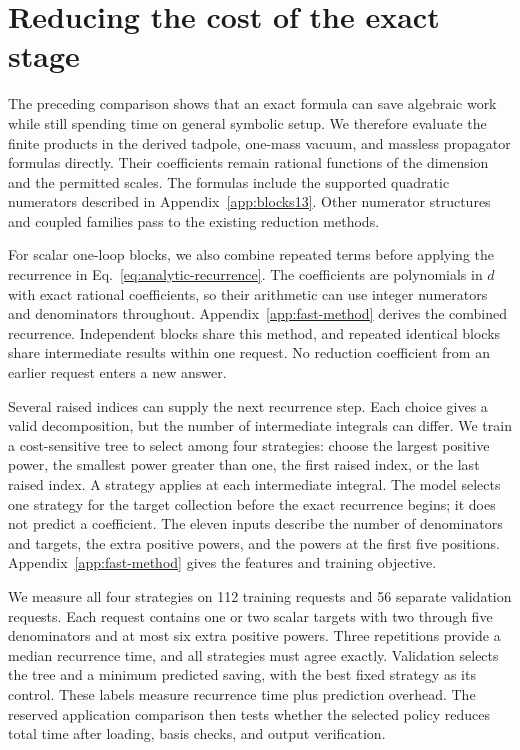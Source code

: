 \section{Reducing the cost of the exact stage}
\label{sec:fast-method}
The preceding comparison shows that an exact formula can save algebraic work while still spending time on general symbolic setup. We therefore evaluate the finite products in the derived tadpole, one-mass vacuum, and massless propagator formulas directly. Their coefficients remain rational functions of the dimension and the permitted scales. The formulas include the supported quadratic numerators described in Appendix~\ref{app:blocks13}. Other numerator structures and coupled families pass to the existing reduction methods.

For scalar one-loop blocks, we also combine repeated terms before applying the recurrence in Eq.~\eqref{eq:analytic-recurrence}. The coefficients are polynomials in $d$ with exact rational coefficients, so their arithmetic can use integer numerators and denominators throughout. Appendix~\ref{app:fast-method} derives the combined recurrence. Independent blocks share this method, and repeated identical blocks share intermediate results within one request. No reduction coefficient from an earlier request enters a new answer.

Several raised indices can supply the next recurrence step. Each choice gives a valid decomposition, but the number of intermediate integrals can differ. We train a cost-sensitive tree to select among four strategies: choose the largest positive power, the smallest power greater than one, the first raised index, or the last raised index. A strategy applies at each intermediate integral. The model selects one strategy for the target collection before the exact recurrence begins; it does not predict a coefficient. The eleven inputs describe the number of denominators and targets, the extra positive powers, and the powers at the first five positions. Appendix~\ref{app:fast-method} gives the features and training objective.

We measure all four strategies on 112 training requests and 56 separate validation requests. Each request contains one or two scalar targets with two through five denominators and at most six extra positive powers. Three repetitions provide a median recurrence time, and all strategies must agree exactly. Validation selects the tree and a minimum predicted saving, with the best fixed strategy as its control. These labels measure recurrence time plus prediction overhead. The reserved application comparison then tests whether the selected policy reduces total time after loading, basis checks, and output verification.

